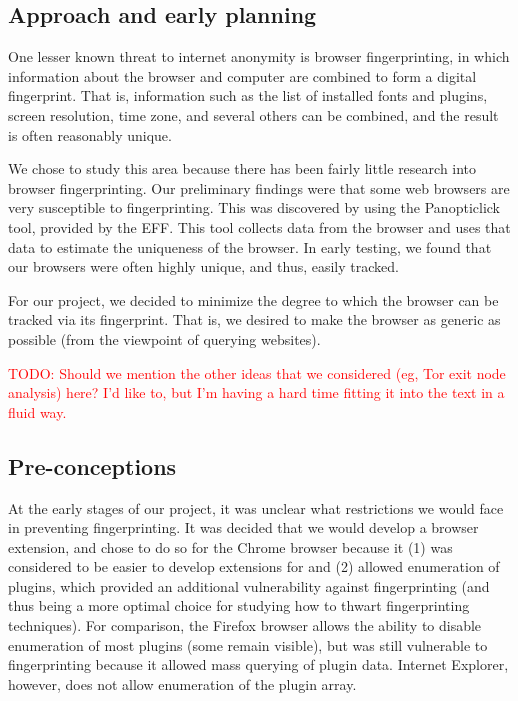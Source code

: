 \documentclass[12pt,a4paper]{article}
\begin{document}
\subsection{Approach and early planning}
One lesser known threat to internet anonymity is browser fingerprinting, in which information about the browser and computer are combined to form a digital fingerprint. That is, information such as the list of installed fonts and plugins, screen resolution, time zone, and several others can be combined, and the result is often reasonably unique.

We chose to study this area because there has been fairly little research into browser fingerprinting. Our preliminary findings were that some web browsers are very susceptible to fingerprinting. This was discovered by using the Panopticlick\cite{panopticlick} tool, provided by the EFF. This tool collects data from the browser and uses that data to estimate the uniqueness of the browser. In early testing, we found that our browsers were often highly unique, and thus, easily tracked.

For our project, we decided to minimize the degree to which the browser can be tracked via its fingerprint. That is, we desired to make the browser as generic as possible (from the viewpoint of querying websites).

\textcolor{red}{TODO: Should we mention the other ideas that we considered (eg, Tor exit node analysis) here? I'd like to, but I'm having a hard time fitting it into the text in a fluid way.}

\subsection{Pre-conceptions}
At the early stages of our project, it was unclear what restrictions we would face in preventing fingerprinting. It was decided that we would develop a browser extension, and chose to do so for the Chrome browser because it (1) was considered to be easier to develop extensions for and (2) allowed enumeration of plugins, which provided an additional vulnerability against fingerprinting (and thus being a more optimal choice for studying how to thwart fingerprinting techniques). For comparison, the Firefox browser allows the ability to disable enumeration of most plugins (some remain visible), but was still vulnerable to fingerprinting because it allowed mass querying of plugin data. Internet Explorer, however, does not allow enumeration of the plugin array.
\end{document}
